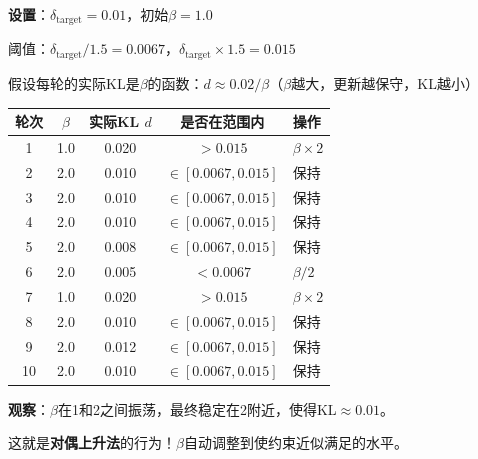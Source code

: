 \documentclass[11pt,a4paper]{article}
\theoremstyle{definition}
\begin{document}
\begin{calculation}
\textbf{设置}：$\delta_{\text{target}} = 0.01$，初始$\beta = 1.0$

阈值：$\delta_{\text{target}}/1.5 = 0.0067$，$\delta_{\text{target}} \times 1.5 = 0.015$

假设每轮的实际KL是$\beta$的函数：$d \approx 0.02 / \beta$（$\beta$越大，更新越保守，KL越小）

\begin{center}
\begin{tabular}{c|c|c|c|l}
\toprule
轮次 & $\beta$ & 实际KL $d$ & 是否在范围内 & 操作 \\
\midrule
1 & 1.0 & 0.020 & $> 0.015$ & $\beta \times 2$ \\
2 & 2.0 & 0.010 & $\in [0.0067, 0.015]$ & 保持 \\
3 & 2.0 & 0.010 & $\in [0.0067, 0.015]$ & 保持 \\
4 & 2.0 & 0.010 & $\in [0.0067, 0.015]$ & 保持 \\
5 & 2.0 & 0.008 & $\in [0.0067, 0.015]$ & 保持 \\
6 & 2.0 & 0.005 & $< 0.0067$ & $\beta / 2$ \\
7 & 1.0 & 0.020 & $> 0.015$ & $\beta \times 2$ \\
8 & 2.0 & 0.010 & $\in [0.0067, 0.015]$ & 保持 \\
9 & 2.0 & 0.012 & $\in [0.0067, 0.015]$ & 保持 \\
10 & 2.0 & 0.010 & $\in [0.0067, 0.015]$ & 保持 \\
\bottomrule
\end{tabular}
\end{center}

\textbf{观察}：$\beta$在1和2之间振荡，最终稳定在2附近，使得KL$\approx 0.01$。

这就是\textbf{对偶上升法}的行为！$\beta$自动调整到使约束近似满足的水平。
\end{calculation}
\end{document}
